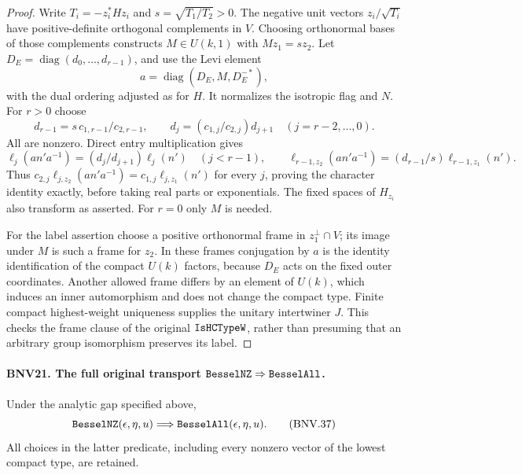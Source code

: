 \documentclass[11pt,a4paper]{article}
\numberwithin{equation}{section}
\theoremstyle{remark}\newtheorem{remark}[theorem]{Remark}
\begin{document}
\begin{proof}
Write $T_i=-z_i^*Hz_i$ and $s=\sqrt{T_1/T_2}>0$.
The negative unit vectors $z_i/\sqrt{T_i}$ have positive-definite
orthogonal complements in $V$.  Choosing orthonormal bases of those
complements constructs $M\in U(k,1)$ with $Mz_1=sz_2$.
Let $D_E=\operatorname{diag}(d_0,\ldots,d_{r-1})$, and use the Levi
element
\[
 a=\operatorname{diag}(D_E,M,D_E^{-*}),
\]
with the dual ordering adjusted as for $H$.  It normalizes the isotropic
flag and $N$.  For $r>0$ choose
\[
 d_{r-1}=s\,c_{1,r-1}/c_{2,r-1},\qquad
 d_j=(c_{1,j}/c_{2,j})d_{j+1}\quad(j=r-2,\ldots,0).
\]
All are nonzero.  Direct entry multiplication gives
\[
 \ell_j(an'a^{-1})=(d_j/d_{j+1})\ell_j(n')\quad(j<r-1),
 \qquad
 \ell_{r-1,z_2}(an'a^{-1})=(d_{r-1}/s)\ell_{r-1,z_1}(n').
\]
Thus $c_{2,j}\ell_{j,z_2}(an'a^{-1})=c_{1,j}\ell_{j,z_1}(n')$
for every $j$, proving the character identity exactly, before taking
real parts or exponentials.  The fixed spaces of $H_{z_i}$ also
transform as asserted.  For $r=0$ only $M$ is needed.

For the label assertion choose a positive orthonormal frame in
$z_1^\perp\cap V$; its image under $M$ is such a frame for $z_2$.
In these frames conjugation by $a$ is the identity identification of
the compact $U(k)$ factors, because $D_E$ acts on the fixed outer
coordinates.  Another allowed frame differs by an element of $U(k)$,
which induces an inner automorphism and does not change the compact
type.  Finite compact highest-weight uniqueness supplies the unitary
intertwiner $J$.  This checks the frame clause of the original
$\texttt{Is\allowbreak HCType\allowbreak W}$, rather than presuming that an arbitrary group
isomorphism preserves its label.
\end{proof}

\paragraph{BNV21. The full original transport $\texttt{Bessel\allowbreak NZ}\Rightarrow\texttt{Bessel\allowbreak All}$.}
\label{claim:BNV21}
Under the analytic gap specified above,
\[
 \texttt{Bessel\allowbreak NZ}(\epsilon,\eta,u)
       \Longrightarrow\texttt{Bessel\allowbreak All}(\epsilon,\eta,u).
 \tag{BNV.37}
\]
All choices in the latter predicate, including every nonzero vector of
the lowest compact type, are retained.
\end{document}
